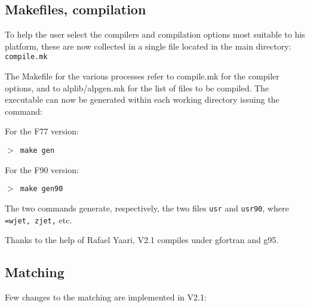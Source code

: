 \documentclass[paper]{JHEP3}
\begin{document}
\begin{appendix}
\subsection{Makefiles, compilation}
 To help the user select the compilers and compilation options most
suitable to his platform, these are now collected in a single file
located in the main directory: {\tt compile.mk}

 The Makefile for the various processes refer to compile.mk for the
 compiler options, and to alplib/alpgen.mk for the list of files to be
 compiled. The executable can now be generated within each working
 directory issuing the command:

For the F77 version: 

{\tt $>$ make gen}

For the F90 version: 

{\tt $>$ make gen90}

The two commands generate, respectively, the two files {\tt *usr} and
{\tt *usr90}, where {\tt *=wjet, zjet,} etc.

Thanks to the help of Rafael Yaari, V2.1 compiles under gfortran and
g95.          

\subsection{Matching}
Few changes to the matching are implemented in V2.1:


\end{appendix}
\end{document}
